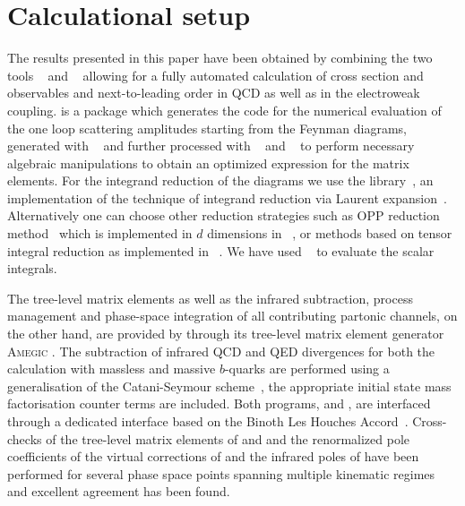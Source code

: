 \section{Calculational setup}
\label{sec:setup}

The results presented in this paper have been obtained by combining the two tools
\GoSam~\cite{Cullen:2011ac,Cullen:2014yla} and \Sherpa~\cite{Gleisberg:2008ta}
allowing for a fully automated calculation of cross section and observables and 
next-to-leading order in QCD as well as in the electroweak coupling.
\GoSam is a package which generates the code for the numerical evaluation of
the one loop scattering amplitudes starting from the Feynman diagrams,
generated with \QGraf~\cite{Nogueira:1991ex} and further processed with
\FORM~\cite{Vermaseren:2000nd,Kuipers:2012rf} and
\Spinney~\cite{Cullen:2010jv} to perform necessary algebraic
manipulations to obtain an optimized expression for the matrix elements.
For the integrand reduction of the diagrams we use the \Ninja
library~\cite{Peraro:2014cba}, an implementation of the technique of integrand
reduction via Laurent expansion~\cite{Mastrolia:2012bu,vanDeurzen:2013saa}.
Alternatively one can choose other reduction strategies such as OPP reduction
method~\cite{Ossola:2006us,Mastrolia:2008jb,Ossola:2008xq} which is
implemented in $d$ dimensions in \Samurai~\cite{Mastrolia:2010nb}, or methods based on
tensor integral reduction as implemented in
\GolemNF~\cite{Heinrich:2010ax,Binoth:2008uq,Cullen:2011kv,Guillet:2013msa}.
We have used \OneLoop~\cite{vanHameren:2010cp} to evaluate the scalar integrals.

The tree-level matrix elements as well as the infrared subtraction, 
process management and phase-space integration of all contributing 
partonic channels, on the other hand, are provided by \Sherpa 
through its tree-level matrix element generator 
\textsc{Amegic} \cite{Krauss:2001iv}. 
The subtraction of infrared QCD and QED divergences for both the 
calculation with massless and massive $b$-quarks are performed using a 
generalisation of the Catani-Seymour scheme~\cite{Catani:1996vz,
  Dittmaier:1999mb,Catani:2002hc,Gleisberg:2007md,Archibald:2011nca,
  Kallweit:2014xda,Kallweit:2015dum,Kallweit:2017khh,Schonherr:2017},
the appropriate initial state mass factorisation counter terms 
are included.
Both programs, \Sherpa and \GoSam, are interfaced through a 
dedicated interface based on the 
Binoth Les Houches Accord~\cite{Binoth:2010xt,Alioli:2013nda}. 
Cross-checks of the tree-level matrix elements of \GoSam and 
\Sherpa and the renormalized pole coefficients of the virtual 
corrections of \GoSam and the infrared poles of \Sherpa have 
been performed for several phase space points spanning 
multiple kinematic regimes and excellent agreement has been found.


